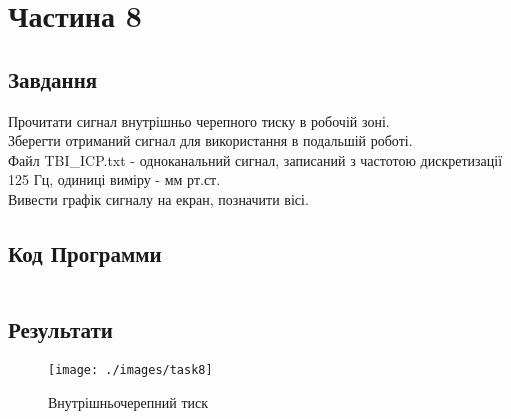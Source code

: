 \section{Частина 8}
\label{sec:task8}

\subsection{Завдання}
\label{subsec:task8_task}

Прочитати сигнал внутрішньо черепного тиску в робочій зоні. \\
Зберегти отриманий сигнал для використання в подальшій роботі. \\
Файл TBI\_ICP.txt - одноканальний сигнал, записаний з частотою дискретизації 125 Гц,
одиниці виміру - мм рт.ст. \\
Вивести графік сигналу на екран, позначити вісі.

\subsection{Код Программи}
\label{subsec:task8_code}
\inputminted{python}{../src/task8.py}

\subsection{Результати}
\label{subsec:task8_results}

\begin{figure}[!ht]
    \centering
    \texttt{[image: ./images/task8]}
    \caption{Внутрішньочерепний тиск}
    \label{fig:intracranial_pressure}
\end{figure}
